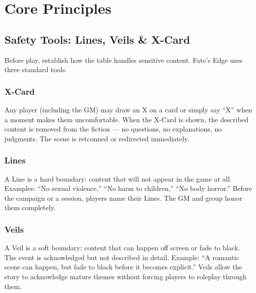 \section{Core Principles}

\subsection{Safety Tools: Lines, Veils \& X-Card}

Before play, establish how the table handles sensitive content. Fate's Edge uses three standard tools.

\subsubsection*{X-Card}
Any player (including the GM) may draw an X on a card or simply say ``X'' when a moment makes them uncomfortable. When the X-Card is shown, the described content is removed from the fiction --- no questions, no explanations, no judgments. The scene is retconned or redirected immediately.

\subsubsection*{Lines}
A Line is a hard boundary: content that will not appear in the game at all. Examples: ``No sexual violence,'' ``No harm to children,'' ``No body horror.'' Before the campaign or a session, players name their Lines. The GM and group honor them completely.

\subsubsection*{Veils}
A Veil is a soft boundary: content that can happen off screen or fade to black. The event is acknowledged but not described in detail. Example: ``A romantic scene can happen, but fade to black before it becomes explicit.'' Veils allow the story to acknowledge mature themes without forcing players to roleplay through them.

